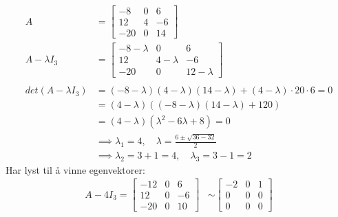 \documentclass[11pt, a4paper, norsk]{article}
\begin{document}
        \begin{Example}{}{}
            \begin{align*}
                A &= \begin{bmatrix}
                    -8 & 0 & 6 \\
                    12 & 4 & -6 \\
                    -20 & 0 & 14
                \end{bmatrix}
                \\
                    A - \lambda I_{3} &= \begin{bmatrix}
                    -8 - \lambda & 0 & 6 \\
                    12 & 4 - \lambda & -6 \\
                    -20 & 0 & 12 - \lambda
                \end{bmatrix}
                \\
                \\
                    det(A - \lambda I_3) &= (-8 - \lambda)(4-\lambda)(14-\lambda) + (4-\lambda)\cdot 20\cdot 6 = 0
                    \\
                                         &= (4-\lambda)((-8-\lambda)(14-\lambda) + 120) \\
                                         &= (4-\lambda)(\lambda^2-6\lambda+8) = 0
                                         \\
                                         &\implies \lambda_{1} = 4, \quad \lambda = \frac{6 \pm \sqrt{36-32}}{2} 
                                         \\
                                         &\implies \lambda_{2} = 3+1 = 4, \quad \lambda_{3} = 3-1 = 2
            \end{align*}            
            Har lyst til å vinne egenvektorer:
            \begin{align*}
                A - 4I_{3} = \begin{bmatrix}
                    -12 & 0 & 6 \\
                    12 & 0 & -6 \\
                    -20 & 0 & 10
                \end{bmatrix} &\sim \begin{bmatrix}
                -2 & 0 & 1 \\
                0 & 0 & 0 \\
                0 & 0 & 0
                \end{bmatrix}

\end{align*}
\end{Example}
\end{document}
